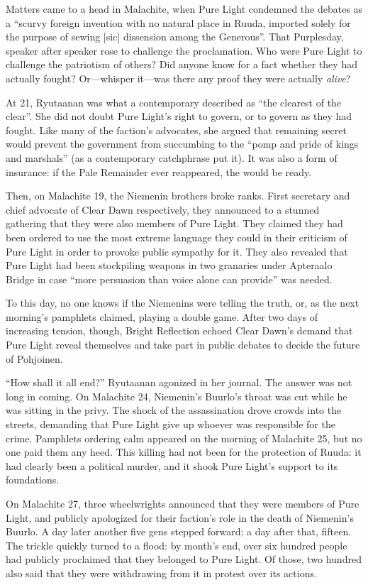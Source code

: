 \documentclass[12pt]{report}
\begin{document}
Matters came to a head in Malachite, when Pure Light condemned the
debates as a ``scurvy foreign invention with no natural place in Ruuda,
imported solely for the purpose of sewing [sic] dissension among the
Generous''.  That Purplesday, speaker after speaker rose to challenge
the proclamation.  Who were Pure Light to challenge the patriotism of
others?  Did anyone know for a fact whether they had actually fought?
Or---whisper it---was there any proof they were actually \emph{alive}?

At 21, Ryutaanan was what a contemporary described as ``the clearest of
the clear''.  She did not doubt Pure Light's right to govern, or to
govern as they had fought.  Like many of the faction's advocates, she
argued that remaining secret would prevent the government from
succumbing to the ``pomp and pride of kings and marshals'' (as a
contemporary catchphrase put it).  It was also a form of insurance: if
the Pale Remainder ever reappeared, the {\aemott} would be ready.

Then, on Malachite 19, the Niemenin brothers broke ranks.  First
secretary and chief advocate of Clear Dawn respectively, they
announced to a stunned gathering that they were also members of Pure
Light.  They claimed they had been ordered to use the most extreme
language they could in their criticism of Pure Light in order to
provoke public sympathy for it.  They also revealed that Pure Light
had been stockpiling weapons in two granaries under Apteraalo Bridge
in case ``more persuasion than voice alone can provide'' was needed.

To this day, no one knows if the Niemenins were telling the truth, or,
as the next morning's pamphlets claimed, playing a double game.  After
two days of increasing tension, though, Bright Reflection echoed Clear
Dawn's demand that Pure Light reveal themselves and take part in
public debates to decide the future of Pohjoinen.

``How shall it all end?'' Ryutaanan agonized in her journal.  The answer
was not long in coming.  On Malachite 24, Niemenin's Buurlo's throat
was cut while he was sitting in the privy.  The shock of the
assassination drove crowds into the streets, demanding that Pure Light
give up whoever was responsible for the crime.  Pamphlets ordering
calm appeared on the morning of Malachite 25, but no one paid them any
heed.  This killing had not been for the protection of Ruuda: it had
clearly been a political murder, and it shook Pure Light's support to
its foundations.

On Malachite 27, three wheelwrights announced that they were members
of Pure Light, and publicly apologized for their faction's role in the
death of Niemenin's Buurlo.  A day later another five gens stepped
forward; a day after that, fifteen.  The trickle quickly turned to a
flood: by month's end, over six hundred people had publicly proclaimed
that they belonged to Pure Light.  Of those, two hundred also said
that they were withdrawing from it in protest over its actions.
\end{document}
